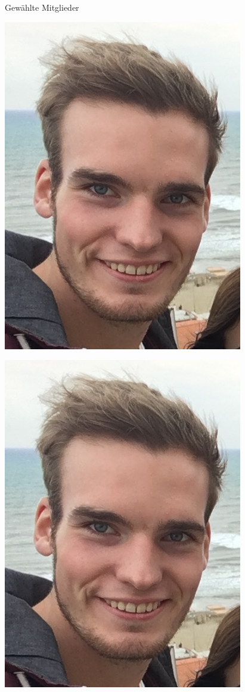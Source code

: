\documentclass[compress, aspectratio=169]{beamer}
\begin{document}
\begin{frame}{Gewählte Mitglieder}
\begin{minipage}{.32\textwidth}
    \includegraphics[height=0.25\textheight]{chris.jpeg}
  \end{minipage}
  \begin{minipage}{.32\textwidth}
    \centering
    \includegraphics[height=0.25\textheight]{chris.jpeg}
  \end{minipage}


\end{frame}
\end{document}
